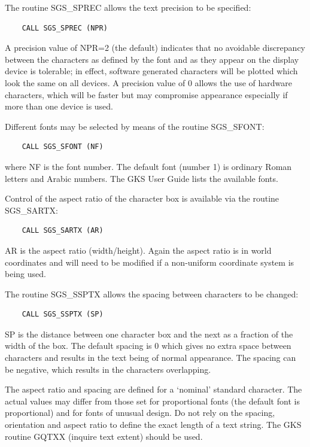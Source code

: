 \documentclass[11pt]{article}
\newcommand{\htmlref}[2]{#1}
\begin{document}
The routine 
\htmlref{SGS\_SPREC}{SGS_SPREC} allows the text precision to be specified:
\begin{verbatim}
    CALL SGS_SPREC (NPR)
\end{verbatim}
A precision value of NPR=2 (the default) indicates that no avoidable
discrepancy between the characters as defined by the font and as
they appear on the display device is tolerable;  in effect, software
generated characters will be plotted which look the same on all
devices.  A precision value of 0 allows the use of hardware
characters, which will be faster but may compromise appearance 
especially if more than one device is used.

Different fonts may 
be selected by means of the routine \htmlref{SGS\_SFONT}{SGS_SFONT}:
\begin{verbatim}
    CALL SGS_SFONT (NF)
\end{verbatim}
where NF is the font number.  The default font (number 1) is ordinary Roman
letters and Arabic numbers.  The GKS User Guide lists the available fonts.

Control of the aspect ratio of the character box is available
via the routine \htmlref{SGS\_SARTX}{SGS_SARTX}:
\begin{verbatim}
    CALL SGS_SARTX (AR)
\end{verbatim}
AR is the aspect ratio (width/height).  Again the aspect ratio is in world
coordinates and will need to be modified if a non-uniform coordinate system
is being used.

The routine \htmlref{SGS\_SSPTX}{SGS_SSPTX}
allows the spacing between characters to be changed:
\begin{verbatim}
    CALL SGS_SSPTX (SP)
\end{verbatim}
SP is the distance between one character box and the next as
a fraction of the width of the box.  The default spacing is 0 which
gives no extra space between characters and results in the text being
of normal appearance.  The spacing can be negative, which results in the
characters overlapping.

The aspect ratio and spacing are defined for a `nominal' standard 
character.  The actual values may differ from those set for proportional fonts 
(the default font is proportional) and for fonts of unusual design.  Do
not rely on the spacing, orientation and aspect ratio to define
the exact length
of a text string.  The GKS routine GQTXX (inquire text extent) should be 
used.
\end{document}
